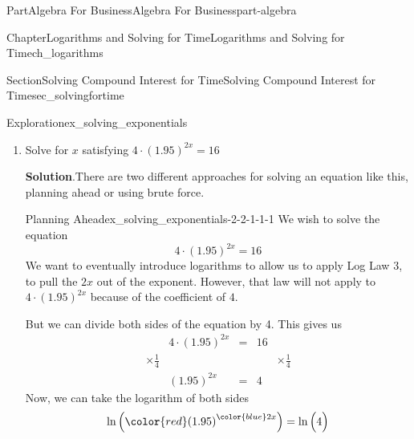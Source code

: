 \documentclass[oneside,10pt,]{tufte-book}
\newcommand{\blocktitlefont}{\relax}
\numberwithin{equation}{chapter}
\newcommand{\amp}{&}
\begin{document}
\begin{partptx}{Part}{Algebra For Business}{}{Algebra For Business}{}{}{part-algebra}
\begin{chapterptx}{Chapter}{Logarithms and Solving for Time}{}{Logarithms and Solving for Time}{}{}{ch_logarithms}
\begin{sectionptx}{Section}{Solving Compound Interest for Time}{}{Solving Compound Interest for Time}{}{}{sec_solvingfortime}
\begin{exploration}{Exploration}{}{ex_solving_exponentials}
\begin{enumerate}[font=\bfseries,label=(\alph*),ref=\alph*]
\begin{equation*}
3x \cdot 0.693{\dots} = 1.609\dots
\end{equation*}
Rearranging the left side, we have%
\begin{equation*}
3\cdot 0.693{\dots}\cdot x = 1.609\dots
\end{equation*}
Using a calculator, we see that \(3\cdot 0.693\dots = 2.079\dots\), which gives%
\begin{equation*}
2.079\dots x = 1.609\dots 
\end{equation*}
Dividing both sides by \(2.079\dots\), we get%
\begin{equation*}
x = \dfrac{1.609\dots}{2.079\dots} = 0.773\dots
\end{equation*}
You could also have done this with the original \(3x \cdot \ln\Big(2\Big) = \ln\Big( 5 \Big)\) by dividing both sides by \(3\cdot\ln(2)\) to get%
\begin{equation*}
x = \dfrac{\ln(5)}{3\cdot \ln(2)}
\end{equation*}
%
\item{}Solve for \(x\) satisfying \(4\cdot(1.95)^{2x} = 16\)%
\par\smallskip%
\noindent\textbf{\blocktitlefont Solution}.\hypertarget{ex_solving_exponentials-2-2}{}\quad{}There are two different approaches for solving an equation like this, planning ahead or using brute force.%
\begin{descriptionlist}
\begin{dlimedium}{Planning Ahead}{ex_solving_exponentials-2-2-1-1-1}%
We wish to solve the equation%
\begin{equation*}
4\cdot(1.95)^{2x} = 16
\end{equation*}
We want to eventually introduce logarithms to allow us to apply Log Law 3, to pull the \(2x\) out of the exponent. However, that law will not apply to \(4\cdot (1.95)^{2x}\) because of the coefficient of \(4\).%
\par
But we can divide both sides of the equation by 4.  This gives us%
\begin{align*}
\amp 4\cdot (1.95)^{2x} \amp = \amp 16 \amp \\
\times\frac{1}{4} \amp \amp\amp \amp \times\frac{1}{4} \\
\amp (1.95)^{2x} \amp = \amp 4 \amp 
\end{align*}
Now, we can take the logarithm of both sides%
\begin{equation*}
\ln\Big( {\color{red}(1.95)}^{\color{blue}2x} \Big) = \ln\Big( 4 \Big)
\end{equation*}

\end{dlimedium}
\end{descriptionlist}
\end{enumerate}
\end{exploration}
\end{sectionptx}
\end{chapterptx}
\end{partptx}
\end{document}
